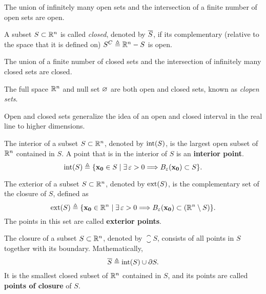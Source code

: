 \begin{prop}
The union of infinitely many open sets and the intersection of a finite number of open sets are open.
\end{prop}

\begin{defn}
	A subset $S\subset\Rtn$ is called \textit{closed}, denoted by $\overline{S}$, if its complementary (relative to the space that it is defined on) $S^C \bydef \Rtn - S$ is open. 
\end{defn}

\begin{prop}
The union of a finite number of closed sets and the intersection of infinitely many closed sets are closed.
\end{prop}

\begin{prop}
	The full space $\Rtn$ and null set $\O$ are both open and closed sets, known as \textit{clopen sets}.
\end{prop}

Open and closed sets generalize the idea of an open and closed interval in the real line to higher dimensions.

\begin{defn}[Interior]
	The interior of a subset $S\subset\Rtn$, denoted by $\interior{S}$, is the largest open subset of $\Rtn$ contained in $S$. 
	A point that is in the interior of $S$ is an \textbf{interior point}.
	\begin{equation}
		\interior{S}\bydef\{\vec{x_0}\in S\st\exists\epsilon > 0\implies B_\epsilon\argopen(\vec{x_0}\argclose)\subset S\}.
	\end{equation}
\end{defn}

\begin{defn}[Exterior]
	The exterior of a subset $S\subset\Rtn$, denoted by $\exterior{S}$, is the complementary set of the closure of $S$, defined as
	\begin{equation}
		\exterior{S}\bydef\{\vec{x_0}\in\Rtn\st\exists\epsilon > 0\implies B_\epsilon\argopen(\vec{x_0}\argclose)\subset
		\left(\Rtn\setminus S\right)\}.
	\end{equation}
	The points in this set are called \textbf{exterior points}.
\end{defn}

\begin{defn}[Closure]
	The closure of a subset $S\subset\Rtn$, denoted by $\closure{S}$, consists of all points in $S$ together with its boundary.
	Mathematically, 
	\begin{equation}
		\closure{S}\bydef\interior{S}\cup\frontier{S}.
	\end{equation}
	It is the smallest closed subset of $\Rtn$ contained in $S$, and its points are called \textbf{points of closure} of $S$.
\end{defn}

